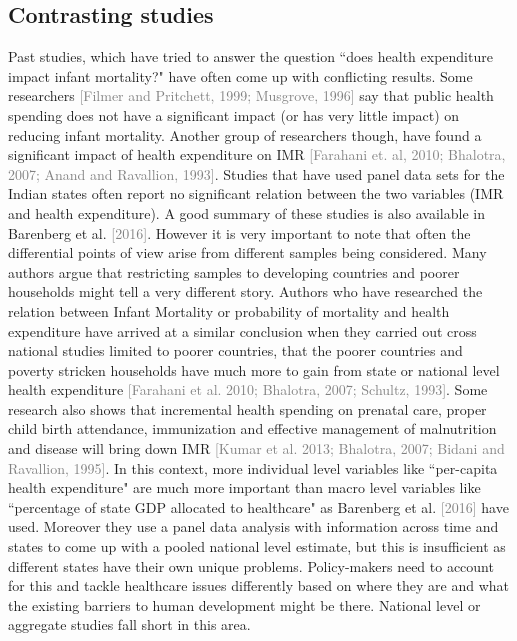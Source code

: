 \documentclass{article}
\begin{document}
\subsection{Contrasting studies}
Past studies, which have tried to answer the question ``does health expenditure impact infant mortality?" have often come up with conflicting results. Some researchers \textcolor{gray}{[Filmer and Pritchett, 1999; Musgrove, 1996]} say that public health spending does not have a significant impact (or has very little impact) on reducing infant mortality. Another group of researchers though, have found a significant impact of health expenditure on IMR \textcolor{gray}{[Farahani et. al, 2010; Bhalotra, 2007; Anand and Ravallion, 1993]}. Studies that have used panel data sets for the Indian states often report no significant relation between the two variables (IMR and health expenditure). A good summary of these studies is also available in Barenberg et al. \textcolor{gray}{[2016]}. However it is very important to note that often the differential points of view arise from different samples being considered. Many authors argue that  restricting samples to developing countries and poorer households might tell a very different story.  Authors who have researched the relation between Infant Mortality or probability of mortality and health expenditure have arrived at a similar conclusion when they carried out cross national studies limited to poorer countries, that the poorer countries and poverty stricken households have much more to gain from state or national level health expenditure \textcolor{gray}{[Farahani et al. 2010; Bhalotra, 2007; Schultz, 1993]}. Some research also shows that incremental health spending on prenatal care, proper child birth attendance, immunization and effective management of malnutrition and disease will bring down IMR \textcolor{gray}{[Kumar et al. 2013;  Bhalotra, 2007; Bidani and Ravallion, 1995]}.  In this context, more individual level variables like ``per-capita health expenditure" are much more important than macro level variables like ``percentage of state GDP allocated to healthcare" as Barenberg et al. \textcolor{gray}{[2016]} have used. Moreover they use a panel data analysis with information across time and states to come up with a pooled national level estimate, but this is insufficient as different states have their own unique problems. Policy-makers need to account for this and tackle healthcare issues differently based on where they are and what the existing barriers to human development might be there.  National level or aggregate studies fall short in this area.\\
\end{document}
